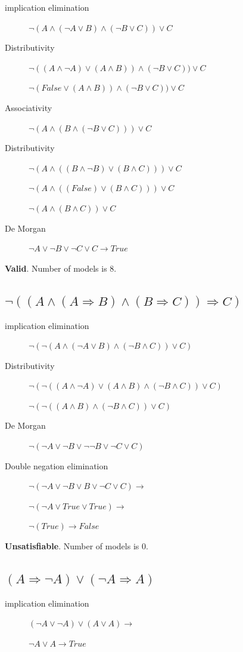 \documentclass{article}                     %
\newcommand{\nt}[1]{\neg #1}
\begin{document}
	\begin{description}
		\item [implication elimination]
		$ \neg (A \land (\nt{A} \lor B) \land (\nt{B} \lor C)) \lor C  $
		\item [Distributivity]
		$ \neg ((A \land \nt{A}) \lor (A \land B)) \land (\nt{B} \lor C)) \lor C  $
		
		$ \neg (False \lor (A \land B)) \land (\nt{B} \lor C)) \lor C  $
		\item [Associativity]
		$ \neg (A \land (B \land (\nt{B} \lor C))) \lor C  $
		\item [Distributivity]
		$ \neg (A \land ((B \land \nt{B}) \lor (B \land C))) \lor C  $
		
		$ \neg (A \land ((False) \lor (B \land C))) \lor C  $

		$ \neg (A \land (B \land C)) \lor C  $
		\item[De Morgan]
		$ \nt{A} \lor \nt{B} \lor \nt{C} \lor C \rightarrow True $
	\end{description}

		\textbf{Valid}.  Number of models is 8.

	\subsection{$ \neg ((A \land (A \Rightarrow B) \land (B \Rightarrow C)) \Rightarrow C )$}
	\begin{description}
		\item[implication elimination] 	$ \neg (\neg(A \land (\nt{A} \lor B) \land (\nt{B} \land C)) \lor C )$
		\item[Distributivity]  $ \neg (\neg((A \land \nt{A}) \lor (A \land B) \land (\nt{B} \land C)) \lor C )$
		
		$ \neg (\neg((A \land B) \land (\nt{B} \land C)) \lor C )$
		\item[De Morgan] 		$ \neg (\nt{A} \lor \nt{B} \lor \nt{\nt{B}} \lor \nt{C} \lor C )$
		\item[Double negation elimination] $ \neg (\nt{A} \lor \nt{B} \lor B \lor \nt{C} \lor C ) \rightarrow $
		
		$ \neg (\nt{A} \lor True \lor True ) \rightarrow$
		
		$ \neg (True) \rightarrow False$
	\end{description}

	\textbf{Unsatisfiable}.  Number of models is 0.
	
	\subsection{$ (A\Rightarrow \nt{A}) \lor (\nt{A} \Rightarrow A) $}
		\begin{description}
		\item[implication elimination] $ (\nt{A} \lor \nt{A}) \lor (A \lor A) \rightarrow $
		
		$ \nt{A} \lor A \rightarrow True$
		
	\end{description}
\end{document}
